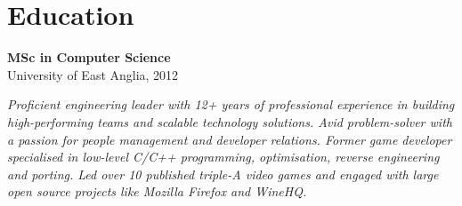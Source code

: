 \documentclass[a4paper,10pt]{article}
\begin{document}
{\begin{minipage}[t]{0.24\textwidth}
{\begin{minipage}[t][\textheight]{\dimexpr\textwidth-10pt}
        \section*{\color{lightblue} Education}
        \textbf{MSc in Computer Science} \\
        University of East Anglia, 2012
        \vfill %
    \end{minipage}%
    }
\end{minipage}%
\hfill%
\begin{minipage}[t]{0.72\textwidth}
    \hspace{-1.55em}
    \colorbox{headerbg}{%
    \begin{minipage}[t]{\dimexpr\textwidth + 0.65em}
        \vspace{0.5cm} %
        \textit{Proficient engineering leader with 12+ years of professional experience in building high-performing teams and scalable technology solutions. Avid problem-solver with a passion for people management and developer relations. Former game developer specialised in low-level C/C++ programming, optimisation, reverse engineering and porting. Led over 10 published triple-A video games and engaged with large open source projects like Mozilla Firefox and WineHQ.}
        \vspace{0.3cm}
    \end{minipage}%
    }

\end{minipage}}
\end{document}

